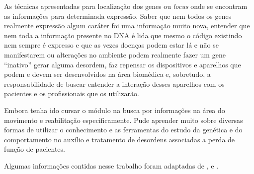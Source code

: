 \documentclass[
	article,			%
	12pt,				%
	oneside,			%
	a4paper,			%
	english,			%
	brazil,				%
	sumario=tradicional
	]{abntex2}
\begin{document}
As técnicas apresentadas para localização dos genes ou \textit{locus} onde se encontram as informações para determinada expressão. Saber que nem todos os genes realmente expressão algum caráter foi uma informação muito nova, entender que nem toda a informação presente no DNA é lida que mesmo o código existindo nem sempre é expresso e que as vezes doenças podem estar lá e não se manifestarem ou alterações no ambiente podem realmente fazer um gene ``inativo'' gerar alguma desordem, faz repensar os dispositivos e aparelhos que podem e devem ser desenvolvidos na área biomédica e, sobretudo, a responsabilidade de buscar entender a interação desses aparelhos com os pacientes e os profissionais que os utilizarão.

Embora tenha ido cursar o módulo na busca por informações na área do movimento e reabilitação especificamente. Pude aprender muito sobre diversas formas de utilizar o conhecimento e as ferramentas do estudo da genética e do comportamento no auxílio e tratamento de desordens associadas a perda de função de pacientes.


Algumas informações contidas nesse trabalho foram adaptadas de \cite{einstein}, \cite{dna} e \cite{macdonald1993novel}.

\postextual


\end{document}
